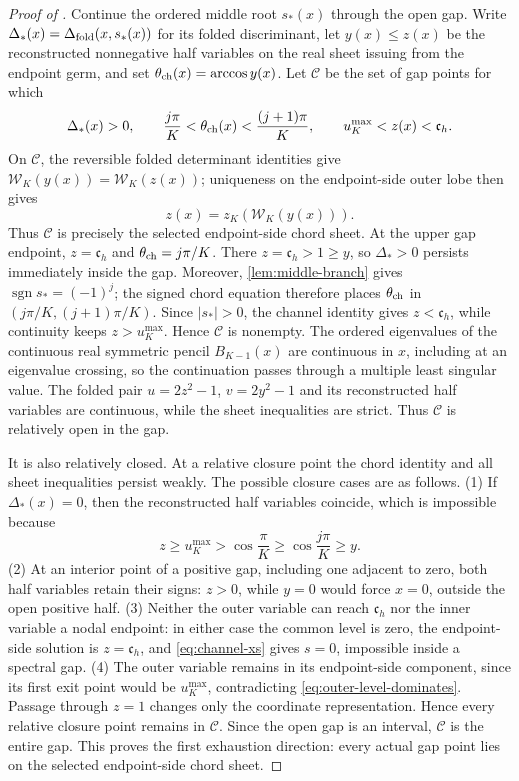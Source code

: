 \documentclass[10pt,twoside]{siamart1116}
\numberwithin{equation}{section}
\begin{document}
\begin{proof}[Proof of ]
Continue the ordered middle root \(s_*(x)\) through the open gap.  Write
\(\Delta_*(x)=\Delta_{\rm fold}(x,s_*(x))\) for its folded discriminant,
let \(y(x)\leq z(x)\) be the reconstructed nonnegative half variables on
the real sheet issuing from the endpoint germ, and set
\(\theta_{\rm ch}(x)=\arccos y(x)\).  Let \(\mathcal C\) be the set of gap points for
which
\[
 \Delta_*(x)>0,\qquad
 \frac{j\pi}{K}<\theta_{\rm ch}(x)<\frac{(j+1)\pi}{K},\qquad
 u_K^{\max}<z(x)<\mathfrak c_h.
\]
On \(\mathcal C\), the reversible folded determinant identities give
\(\mathcal W_K(y(x))=\mathcal W_K(z(x))\); uniqueness on the endpoint-side
outer lobe then gives
\[
 z(x)=z_K(\mathcal W_K(y(x))).
\]
Thus \(\mathcal C\) is precisely the selected endpoint-side chord sheet.
At the upper gap endpoint, \(z=\mathfrak c_h\) and
\(\theta_{\rm ch}=j\pi/K\).  There
\(z=\mathfrak c_h>1\geq y\), so \(\Delta_*>0\) persists immediately
inside the gap.  Moreover,
\cref{lem:middle-branch} gives \(\operatorname{sgn}s_*=(-1)^j\); the signed
chord equation therefore places
\(\theta_{\rm ch}\) in
\((j\pi/K,(j+1)\pi/K)\).  Since \(|s_*|>0\), the channel identity gives
\(z<\mathfrak c_h\), while continuity keeps \(z>u_K^{\max}\).  Hence
\(\mathcal C\) is nonempty.  The ordered eigenvalues of the continuous real symmetric pencil
\(B_{K-1}(x)\) are continuous in \(x\), including at an eigenvalue crossing,
so the continuation passes through a multiple least singular value.  The
folded pair \(u=2z^2-1\), \(v=2y^2-1\) and its reconstructed half variables
are continuous, while the sheet inequalities are strict.  Thus
\(\mathcal C\) is relatively open in the gap.

It is also relatively closed.  At a relative closure point the chord
identity and all sheet inequalities persist weakly.  The possible closure
cases are as follows.  (1) If \(\Delta_*(x)=0\), then the reconstructed half
variables coincide, which is impossible because
\[
 z\geq u_K^{\max}>\cos\frac{\pi}{K}
 \geq\cos\frac{j\pi}{K}\geq y.
\]
(2) At an interior point of a positive gap, including one adjacent to zero,
both half variables retain their signs: \(z>0\), while \(y=0\) would force
\(x=0\), outside the open positive half.  (3) Neither the outer variable can
reach \(\mathfrak c_h\) nor the inner variable a nodal endpoint: in either
case the common level is zero, the endpoint-side solution is
\(z=\mathfrak c_h\), and \eqref{eq:channel-xs} gives \(s=0\), impossible
inside a spectral gap.  (4) The
outer variable remains in its endpoint-side component, since its first exit
point would be \(u_K^{\max}\), contradicting
\eqref{eq:outer-level-dominates}.  Passage through \(z=1\) changes only the
coordinate representation.  Hence every relative closure point remains in
\(\mathcal C\).  Since the open gap is an interval, \(\mathcal C\) is the
entire gap.  This proves the first exhaustion direction: every actual gap
point lies on the selected endpoint-side chord sheet.


\end{proof}
\end{document}
